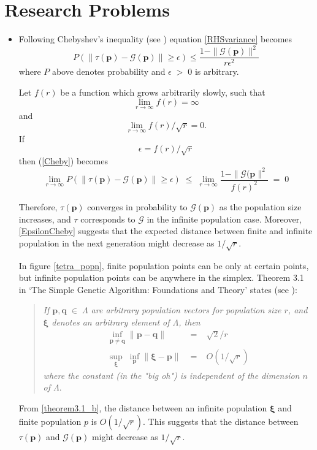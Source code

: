 \section{Research Problems}
\begin{itemize}
\item{
Following Chebyshev's inequality (see \cite{ChebyshevInequality}) equation \ref{RHSvariance} becomes  
\begin{equation}
\label{Cheby}
P(\| \tau (\bm{p}) - \mathcal{G}(\bm{p}) \| \geq \epsilon) \leq \frac{1 - \|\mathcal{G}(\bm{p})\|^2} {r{\epsilon}^2}
\end{equation}
where $P$ above denotes probability and $\epsilon \;>\; 0$ is arbitrary.

Let $f(r)$ be a function which grows arbitrarily slowly, such that 
\[
\lim_{r \to \infty} f(r)  =  \infty
\]
and
\[
\lim_{r \to \infty} f(r)/\sqrt{r}  =  0.
\]
If 
\begin{equation}
\label{EpsilonCheby}
\epsilon  =  f(r)/\sqrt{r}
\end{equation}
then (\ref{Cheby}) becomes
\begin{equation*}
\lim_{r \to \infty} P(\| \tau (\bm{p}) - \mathcal{G}(\bm{p}) \| \geq \epsilon) \; \leq \; \lim_{r \to \infty}\frac{1 - \|\mathcal{G}(\bm{p}\|^2} {{f(r)}^2} \; = \; 0
\end{equation*}

Therefore, $\tau(\bm{p})$ converges in probability to $\mathcal{G}(\bm{p})$ as the population size increases, 
and $\tau$ corresponds to $\mathcal{G}$ 
in the infinite population case. Moreover, \ref{EpsilonCheby} suggests that the expected distance between finite and 
infinite population in the next generation might decrease as $1/\sqrt{r}$.

In figure \ref{tetra_popn}, finite population points can be only at certain points, but infinite population points can be anywhere in the simplex. 
Theorem 3.1 in `The Simple Genetic Algorithm: Foundations and Theory' states (see \cite{Vose1999}):  
\begin{quote}
\emph{If $\bm{p},\bm{q} \;\in\; \Lambda$ are 
arbitrary population vectors for population size $r$, and $\bm{\xi}$ denotes an arbitrary element of $\Lambda$, then 
\begin{eqnarray}
\underset{\bm{p} \neq \bm{q}}{\inf} \|\bm{p} - \bm{q}\| &\;=\;& \sqrt{2}/r    \label{theorem3.1_a} \\
\underset{\bm{\xi}}{\sup} \; \underset{\bm{p}}{\inf} \|\bm{\xi} - \bm{p}\| &\;=\;& O(1/\sqrt{r})     \label{theorem3.1_b}
\end{eqnarray}
where the constant (in the "big oh") is independent of the dimension $n$ of $\Lambda$}.
\end{quote}
From \ref{theorem3.1_b}, the distance between an infinite population $\bm{\xi}$ and finite population $p$ is $O(1/\sqrt{r})$. 
This suggests that the distance between $\tau (\bm{p})$ and $\mathcal{G}(\bm{p})$ might decrease as $1/\sqrt{r}$.

}
\end{itemize}
